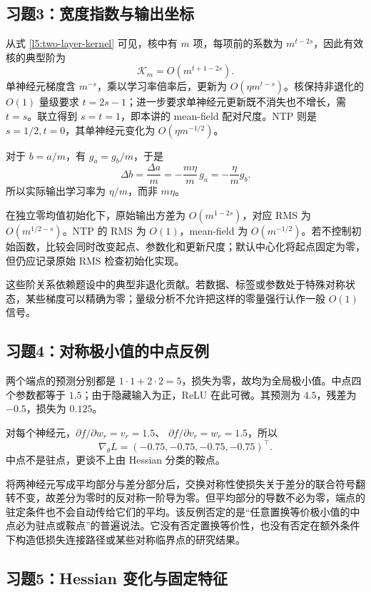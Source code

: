 \subsection*{习题3：宽度指数与输出坐标}

从式 \eqref{l5:two-layer-kernel} 可见，核中有 $m$ 项，每项前的系数为
$m^{t-2s}$，因此有效核的典型阶为
\[
 \mathcal K_m=O\!\left(m^{t+1-2s}\right).
\]
单神经元梯度含 $m^{-s}$，乘以学习率倍率后，更新为
$O(\eta m^{t-s})$。核保持非退化的 $O(1)$ 量级要求 $t=2s-1$；进一步要求单神经元更新既不消失也不增长，需 $t=s$。联立得到
$s=t=1$，即本讲的 mean-field 配对尺度。NTP 则是 $s=1/2,t=0$，其单神经元变化为 $O(\eta m^{-1/2})$。

对于 $b=a/m$，有 $g_a=g_b/m$，于是
\[
 \Delta b=\frac{\Delta a}{m}
 =-\frac{m\eta}{m}\,g_a
 =-\frac\eta m g_b.
\]
所以实际输出学习率为 $\eta/m$，而非 $m\eta$。

在独立零均值初始化下，原始输出方差为 $O(m^{1-2s})$，对应 RMS 为
$O(m^{1/2-s})$。NTP 的 RMS 为 $O(1)$，mean-field 为
$O(m^{-1/2})$。若不控制初始函数，比较会同时改变起点、参数化和更新尺度；默认中心化将起点固定为零，但仍应记录原始 RMS 检查初始化实现。

这些阶关系依赖题设中的典型非退化贡献。若数据、标签或参数处于特殊对称状态，某些梯度可以精确为零；量级分析不允许把这样的零量强行认作一般 $O(1)$ 信号。

\subsection*{习题4：对称极小值的中点反例}

两个端点的预测分别都是 $1\cdot1+2\cdot2=5$，损失为零，故均为全局极小值。中点四个参数都等于 $1.5$；由于隐藏输入为正，ReLU 在此可微。其预测为 $4.5$，残差为 $-0.5$，损失为 $0.125$。

对每个神经元，$\partial f/\partial w_r=v_r=1.5$、
$\partial f/\partial v_r=w_r=1.5$，所以
\[
 \nabla_\theta L=(-0.75,-0.75,-0.75,-0.75)^\top.
\]
中点不是驻点，更谈不上由 Hessian 分类的鞍点。

将两神经元写成平均部分与差分部分后，交换对称性使损失关于差分的联合符号翻转不变，故差分为零时的反对称一阶导为零。但平均部分的导数不必为零，端点的驻定条件也不会自动传给它们的平均。该反例否定的是“任意置换等价极小值的中点必为驻点或鞍点”的普遍说法。它没有否定置换等价性，也没有否定在额外条件下构造低损失连接路径或某些对称临界点的研究结果。

\subsection*{习题5：Hessian 变化与固定特征}

